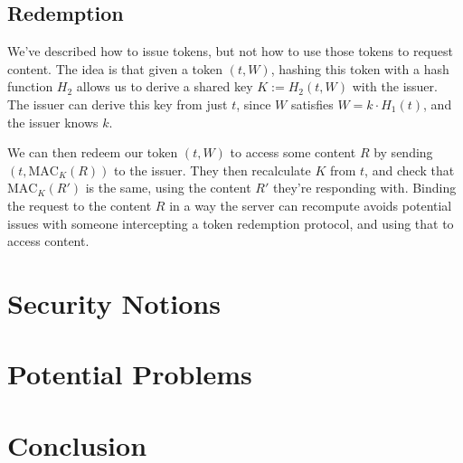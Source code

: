 \documentclass[9pt, a4paper]{article}
\begin{document}
\subsection{Redemption}

We've described how to issue tokens, but not how to use those
tokens to request content. The idea is that given a token $(t, W)$,
hashing this token with a hash function $H_2$ allows us to derive
a shared key $K := H_2(t, W)$ with the issuer. The issuer can derive this
key from just $t$, since $W$ satisfies $W = k \cdot H_1(t)$, and the
issuer knows $k$.

We can then redeem our token $(t, W)$ to access some content $R$
by sending $(t, \text{MAC}_K(R))$ to the issuer. They then recalculate
$K$ from $t$, and check that $\text{MAC}_K(R')$ is the same, using
the content $R'$ they're responding with. Binding the
request to the content $R$ in a way the server can recompute
avoids potential issues with someone intercepting a token
redemption protocol, and using that to access content.

\section{Security Notions}

\section{Potential Problems}
\section{Conclusion}


\footnotesize 
\end{document}
